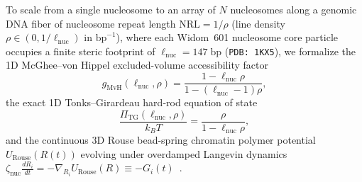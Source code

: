 \documentclass[11pt,a4paper]{article}
\theoremstyle{definition}
\begin{document}
To scale from a single nucleosome to an array of $N$ nucleosomes along a genomic DNA fiber of nucleosome repeat length $\mathrm{NRL} = 1/\rho$ (line density $\rho \in (0, 1/\ell_{\mathrm{nuc}})$ in $\mathrm{bp}^{-1}$), where each Widom~601 nucleosome core particle occupies a finite steric footprint of $\ell_{\mathrm{nuc}} = 147\;\mathrm{bp}$ (\texttt{PDB: 1KX5}), we formalize the 1D McGhee--von Hippel excluded-volume accessibility factor~\cite{McGheeVonHippel1974}
\begin{equation}
  g_{\mathrm{MvH}}(\ell_{\mathrm{nuc}}, \rho) = \frac{1 - \ell_{\mathrm{nuc}}\rho}{1 - (\ell_{\mathrm{nuc}} - 1)\rho},
\end{equation}
the exact 1D Tonks--Girardeau hard-rod equation of state~\cite{Tonks1936}
\begin{equation}
  \frac{\Pi_{\mathrm{TG}}(\ell_{\mathrm{nuc}}, \rho)}{k_B T} = \frac{\rho}{1 - \ell_{\mathrm{nuc}}\rho},
\end{equation}
and the continuous 3D Rouse bead-spring chromatin polymer potential $U_{\mathrm{Rouse}}(R(t))$ evolving under overdamped Langevin dynamics $\zeta_{\mathrm{nuc}}\frac{dR_i}{dt} = -\nabla_{R_i} U_{\mathrm{Rouse}}(R) \equiv -G_i(t)$~\cite{DoiEdwards1986}.
\end{document}
